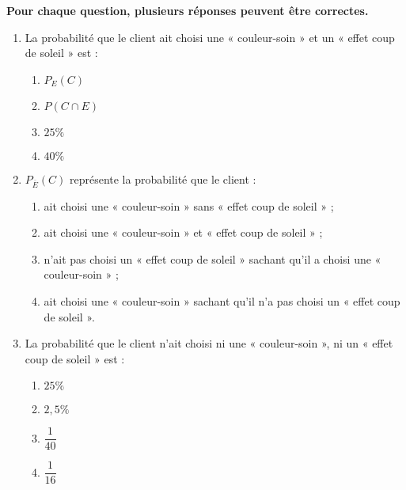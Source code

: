 \documentclass[a4paper,11pt,eval]{nsi}
\begin{document}
\textbf{Pour chaque question, plusieurs réponses peuvent être correctes.}
\begin{enumerate}
    \item La probabilité que le client ait choisi une « couleur-soin » et un « effet coup de soleil » est :
    \begin{multicols}{4}
        \begin{enumerate}[label=\ding{111}]
            \item $P_E(C)$
            \item $P(C \cap E)$
            \item $25 \%$
            \item $40\%$
        \end{enumerate}
    \end{multicols}

    \item $P_{\overline{E}}(C)$ représente la probabilité que le client :
    \begin{enumerate}[label=\ding{111}]
        \item ait  choisi une « couleur-soin » sans « effet coup de soleil » ;
        \item ait  choisi une « couleur-soin » et « effet coup de soleil » ;
        \item n'ait pas choisi un « effet coup de soleil » sachant qu'il a choisi une « couleur-soin » ;
        \item ait choisi une « couleur-soin » sachant qu'il n'a pas choisi un « effet coup de soleil ».   
    \end{enumerate}

    \item La probabilité que le client n'ait choisi ni une « couleur-soin », ni un « effet coup de soleil » est :
    \begin{multicols}{4}
        \begin{enumerate}[label=\ding{111}]
            \item $25 \%$
            \item $2,5 \%$
            \item $\dfrac{1}{40}$
            \item $\dfrac{1}{16}$
        \end{enumerate}
    \end{multicols}
\end{enumerate}


\newpage
\end{document}
